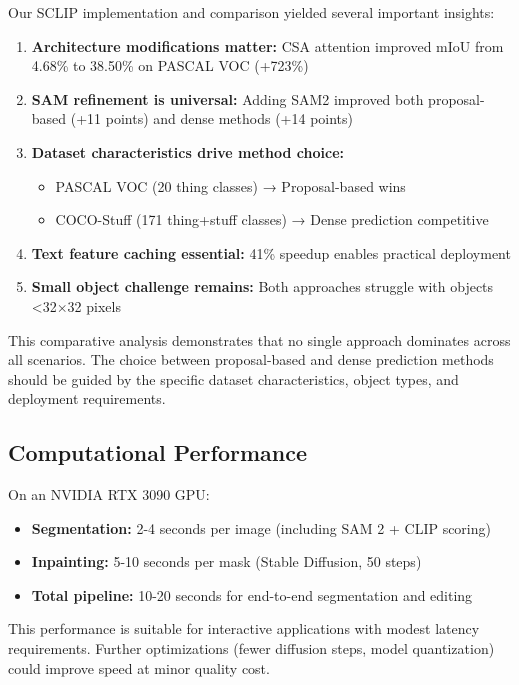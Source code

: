 Our SCLIP implementation and comparison yielded several important insights:

\begin{enumerate}
    \item \textbf{Architecture modifications matter:} CSA attention improved mIoU from 4.68\% to 38.50\% on PASCAL VOC (+723\%)

    \item \textbf{SAM refinement is universal:} Adding SAM2 improved both proposal-based (+11 points) and dense methods (+14 points)

    \item \textbf{Dataset characteristics drive method choice:}
    \begin{itemize}
        \item PASCAL VOC (20 thing classes) → Proposal-based wins
        \item COCO-Stuff (171 thing+stuff classes) → Dense prediction competitive
    \end{itemize}

    \item \textbf{Text feature caching essential:} 41\% speedup enables practical deployment

    \item \textbf{Small object challenge remains:} Both approaches struggle with objects <32$\times$32 pixels
\end{enumerate}

This comparative analysis demonstrates that no single approach dominates across all scenarios. The choice between proposal-based and dense prediction methods should be guided by the specific dataset characteristics, object types, and deployment requirements.



\subsection{Computational Performance}

On an NVIDIA RTX 3090 GPU:
\begin{itemize}
    \item \textbf{Segmentation:} 2-4 seconds per image (including SAM 2 + CLIP scoring)
    \item \textbf{Inpainting:} 5-10 seconds per mask (Stable Diffusion, 50 steps)
    \item \textbf{Total pipeline:} 10-20 seconds for end-to-end segmentation and editing
\end{itemize}

This performance is suitable for interactive applications with modest latency requirements. Further optimizations (fewer diffusion steps, model quantization) could improve speed at minor quality cost.
